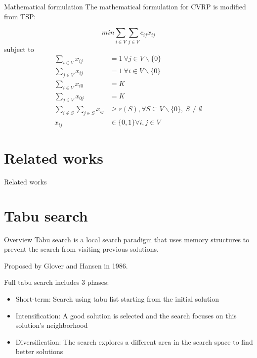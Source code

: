 \documentclass[9pt]{beamer}
\begin{document}
\begin{frame}{Mathematical formulation}
The mathematical formulation for CVRP is modified from TSP:

\begin{equation}
    min \sum_{i \in V} \sum_{j \in V} c_{ij}x_{ij}
\end{equation}
subject to
\begin{align}
    \sum_{i \in V} x_{ij} & = 1 \ \forall j \in V \backslash \{0\} \\
    \sum_{j \in V} x_{ij} & = 1 \ \forall i \in V \backslash \{0\} \\
    \sum_{i \in V} x_{i0} & = K \\
    \sum_{j \in V} x_{0j} & = K \\
    \sum_{i \notin S} \sum_{j \in S} x_{ij} & \geq r(S), \forall S \subseteq V \backslash \{0\},\ S \neq \emptyset\\
    x_{ij} & \in \{ 0, 1 \} \forall i,j \in V
\end{align}

\end{frame}

\section{Related works}
\begin{frame}{Related works}

\end{frame}

\section{Tabu search}
\begin{frame}{Overview}
Tabu search is a local search paradigm that uses memory structures to prevent the search from visiting previous solutions.

Proposed by Glover and Hansen in 1986.

Full tabu search includes 3 phases:
\begin{itemize}
    \item Short-term: Search using tabu list starting from the initial solution
    \item Intensification: A good solution is selected and the search focuses on this solution's neighborhood
    \item Diversification: The search explores a different area in the search space to find better solutions
\end{itemize}
\end{frame}
\end{document}
